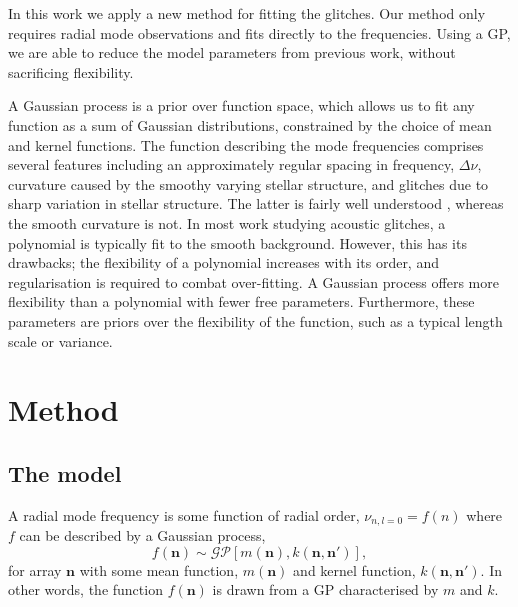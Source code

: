 \documentclass[linenumbers,modern]{aastex631dm}
\begin{document}
In this work we apply a new method for fitting the glitches. Our method only
requires radial mode observations and fits directly to the frequencies. Using
a GP, we are able to reduce the model parameters from previous work, without
sacrificing flexibility. 

A Gaussian process is a prior over function space, which allows us to fit any
function as a sum of Gaussian distributions, constrained by the choice of mean and kernel
functions. The function describing the mode frequencies comprises several
features including an approximately regular spacing in frequency,
\(\Delta\nu\), curvature caused by the smoothy varying stellar structure, and
glitches due to sharp variation in stellar structure. The latter is fairly well
understood \citep{Houdek:2007}, whereas the smooth curvature is not. In
most work studying acoustic glitches, a polynomial is typically fit
to the smooth background. However, this has its drawbacks; the flexibility
of a polynomial increases with its order, and regularisation is required to
combat over-fitting. A Gaussian process offers more flexibility than a
polynomial with fewer free parameters. Furthermore, these parameters are priors
over the flexibility of the function, such as a typical length scale or
variance.


\section{Method}\label{sec:method}


\subsection{The model}\label{sec:model}

A radial mode frequency is some function of radial order,
\(\nu_{n,l=0} = f(n)\) where \(f\) can be described by a Gaussian process,
%
\begin{equation}
    f(\bm n) \sim \mathcal{GP}\left[m(\bm n), k(\bm n, \bm n')\right],
\end{equation}
%
for array \(\bm n\) with some mean function, \(m(\bm n)\) and kernel function,
\(k(\bm n, \bm n')\). In other words, the function \(f(\bm n)\) is drawn from a
GP characterised by \(m\) and \(k\).
\end{document}

